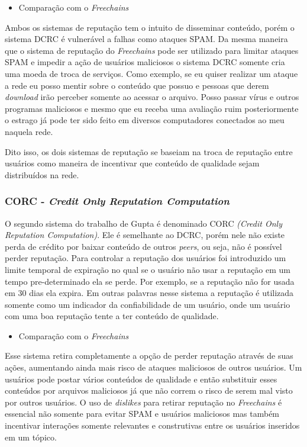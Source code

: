\documentclass[12pt]{article}
\newcommand{\FC} {\textit{Freechains}\xspace}
\begin{document}
\begin{itemize}
    \item Comparação com o \FC
\end{itemize}

Ambos os sistemas de reputação tem o intuito de disseminar conteúdo, porém o sistema DCRC é vulnerável a falhas como ataques SPAM.
Da mesma maneira que o sistema de reputação do \FC pode ser utilizado para limitar ataques SPAM e impedir a ação de usuários maliciosos o sistema DCRC somente cria uma moeda de troca de serviços.
Como exemplo, se eu quiser realizar um ataque a rede eu posso mentir sobre o conteúdo que possuo e pessoas que derem \textit{download} irão perceber somente ao acessar o arquivo.
Posso passar vírus e outros programas maliciosos e mesmo que eu receba uma avaliação ruim posteriormente o estrago já pode ter sido feito em diversos computadores conectados ao meu naquela rede.

Dito isso, os dois sistemas de reputação se baseiam na troca de reputação entre usuários como maneira de incentivar que conteúdo de qualidade sejam distribuídos na rede.


\subsubsection{CORC - \textit{Credit Only Reputation Computation}} \label{subsub:corc}

O segundo sistema do trabalho de Gupta é denominado CORC \textit{(Credit Only Reputation Computation)}. Ele é semelhante ao DCRC, porém nele não existe perda de crédito por baixar conteúdo de outros \textit{peers}, ou seja, não é possível perder reputação.
Para controlar a reputação dos usuários foi introduzido um limite temporal de expiração no qual se o usuário não usar a reputação em um tempo pre-determinado ela se perde. 
Por exemplo, se a reputação não for usada em 30 dias ela expira.
Em outras palavras nesse sistema a reputação é utilizada somente como um indicador da confiabilidade de um usuário, onde um usuário com uma boa reputação tente a ter conteúdo de qualidade.

\begin{itemize}
    \item Comparação com o \FC
\end{itemize}

Esse sistema retira completamente a opção de perder reputação através de suas ações, aumentando ainda mais risco de ataques maliciosos de outros usuários.
Um usuários pode postar vários conteúdos de qualidade e então substituir esses conteúdos por arquivos maliciosos já que não correm o risco de serem mal visto por outros usuários.
O uso de \textit{dislikes} para retirar reputação no \FC é essencial não somente para evitar SPAM e usuários maliciosos mas também incentivar interações somente relevantes e construtivas entre os usuários inseridos em um tópico.
\end{document}
